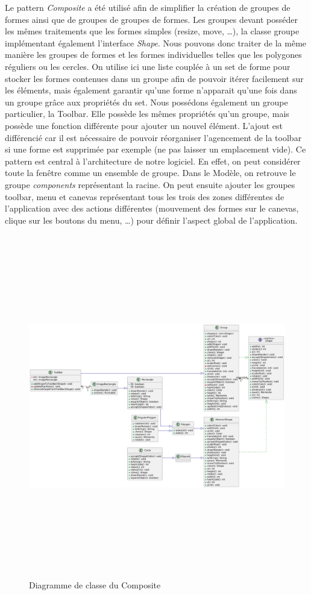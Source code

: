 \documentclass{article}
\begin{document}
Le pattern \textit{Composite} a été utilisé afin de simplifier la création de groupes de formes ainsi que de groupes de groupes de formes.
Les groupes devant posséder les mêmes traitements que les formes simples (resize, move, \ldots), la classe groupe implémentant également l'interface \textit{Shape}. Nous pouvons donc 
traiter de la même manière les groupes de formes et les formes individuelles telles que les polygones réguliers ou les cercles.  On utilise ici une liste couplée à un set de forme pour stocker
les formes contenues dans un groupe afin de pouvoir itérer facilement sur les éléments, mais également garantir qu'une forme n'apparait qu'une fois dans un groupe grâce aux propriétés du set.
Nous possédons également un groupe particulier, la Toolbar. Elle possède les mêmes propriétés qu'un groupe, mais possède une fonction différente pour ajouter un nouvel élément. L'ajout est différencié
car il est nécessaire de pouvoir réorganiser l'agencement de la toolbar si une forme est supprimée par exemple (ne pas laisser un emplacement vide). Ce pattern est central à l'architecture de notre logiciel.
En effet, on peut considérer toute la fenêtre comme un ensemble de groupe. Dans le Modèle, on retrouve le groupe \textit{components} représentant la racine. On peut ensuite ajouter les groupes toolbar, menu et
canevas représentant tous les trois des zones différentes de l'application avec des actions différentes (mouvement des formes sur le canevas, clique sur les boutons du menu, \ldots) pour définir l'aspect global de l'application. 
\begin{figure}[h]
    \centering
    \includegraphics[width=\textwidth,height=15.0cm,keepaspectratio]{Composite.png}
    \caption{Diagramme de classe du Composite}
    \label{Composite}
\end{figure}
\FloatBarrier
\end{document}
